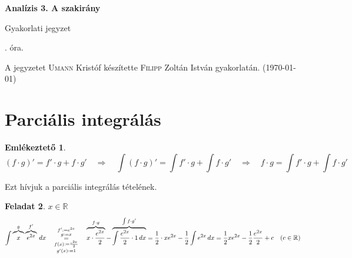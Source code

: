 \documentclass[a4paper,11.5pt]{article}
\begin{document}
	\setlength\parindent{0pt}
	\def\a{\textbf{a}}
	\def\b{\textbf{b}}
	\def\N{\hskip 10 true mm}
	\def\a{\textbf{a}}
	\def\b{\textbf{b}}
	\def\c{\textbf{c}}
	\def\d{\textbf{d}}
	\def\e{\textbf{e}}
	\def\gg{$\gamma$}
	\def\vi{\textbf{i}}
	\def\jj{\textbf{j}}
	\def\kk{\textbf{k}}
	\def\fh{\overrightarrow}
	\def\l{\lambda}
	\def\m{\mu}
	\def\v{\textbf{v}}
	\def\0{\textbf{0}}
	\def\s{\hspace{0.2mm}\vphantom{\beta}}
	\def\Z{\mathbb{Z}}
	\def\Q{\mathbb{Q}}
	\def\R{\mathbb{R}}
	\def\C{\mathbb{C}}
	\def\N{\mathbb{N}}
	\def\Rn{\mathbb{R}^{n}}
	\def\Ra{\overline{\mathbb{R}}}
	\def\sume{\displaystyle\sum_{n=1}^{+\infty}}
	\def\sumn{\displaystyle\sum_{n=0}^{+\infty}}
	\def\biz{\emph{Bizonyítás:\ }}
	\def\narrow{\underset{n\rightarrow+\infty}{\longrightarrow}}
	\def\limn{\displaystyle\lim_{n\to +\infty}}
	
	\theoremstyle{definition}
	\newtheorem{theorem}{Tétel}[subsection] %
	
	\theoremstyle{definition}
	\newtheorem{definition}[theorem]{Definíció} %
	\newtheorem{example}[theorem]{Példa} %
	\newtheorem{exercise}[theorem]{Házi feladat} %
	\newtheorem{note}[theorem]{Megjegyzés} %
	\newtheorem{task}[theorem]{Feladat} %
	\newtheorem{revision}[theorem]{Emlékeztető} %
	\begin{center}
		{\LARGE\textbf{Analízis 3. A szakirány}}
		\smallskip
		
		{\Large Gyakorlati jegyzet}
		
		. óra.
	\end{center}
	A jegyzetet \textsc{Umann} Kristóf készítette \textsc{Filipp} Zoltán István gyakorlatán. (\today)
	\section{Parciális integrálás}
	\begin{revision}
		\[ (f\cdot g)'=f'\cdot g + f\cdot g'\quad \Rightarrow\quad \int(f\cdot g)'=\int f'\cdot g + \int f\cdot g'\quad \Rightarrow\quad f\cdot g=\int f'\cdot g + \int f\cdot g'\]
		\begin{center}	
		\end{center}
		Ezt hívjuk a parciális integrálás tételének.
	\end{revision}
	\begin{task}$x\in\R$
		\[ \int \overbrace{x\vphantom{e^2}}^{g}\overbrace{e^{2x}}^{f'}\,dx\quad \underset{g'(x):=1}{\overset{f':=e^{2x}}{\overset{g:=x}{\underset{f(x):=\frac{e^{2x}}{2}}{=}}}}
		\quad \overbrace{x\cdot\frac{e^{2x}}{2}}^{f\cdot g}-\overbrace{\int\frac{e^{2x}}{2}\cdot1\,dx}^{\int f\cdot g'}=\frac{1}{2}\cdot xe^{2x}-\frac{1}{2}\int e^{2x}\,dx=\frac{1}{2}xe^{2x}-\frac{1}{2}\frac{e^{2x}}{2}+c\quad (c\in\R) \]
	\end{task}
	
\end{document}
